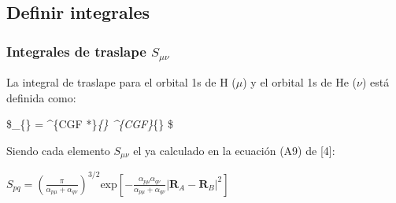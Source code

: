 \documentclass[
  letterpaper,
  DIV=11,
  numbers=noendperiod]{scrreprt}
\begin{document}
\hypertarget{definir-integrales}{%
\subsection{Definir integrales}\label{definir-integrales}}

\hypertarget{integrales-de-traslape-s_mu-nu}{%
\subsubsection{\texorpdfstring{Integrales de traslape
\(S_{\mu \nu}\)}{Integrales de traslape S\_\{\textbackslash mu \textbackslash nu\}}}\label{integrales-de-traslape-s_mu-nu}}

La integral de traslape para el orbital 1s de H (\(\mu\)) y el orbital
1s de He (\(\nu\)) está definida como:

\$\_\{\mu \nu\} = \int {}  \phi\^{}\{CGF
*\}\emph{\{\mu\} \phi\^{}\{CGF\}}\{\nu\} \$

Siendo cada elemento \(S_{\mu\nu}\) el ya calculado en la ecuación (A9)
de {[}4{]}:

\(S_{pq} = \left( \frac{\pi}{\alpha_{p \mu} + \alpha_{q \nu}} \right)^{3/2} \mathrm{exp}[ -\frac{\alpha_{p \mu} \alpha_{q \nu}}{\alpha_{p \mu}+ \alpha_{q \nu}} |\textbf{R}_A-\textbf{R}_B|^2]\)
\end{document}
